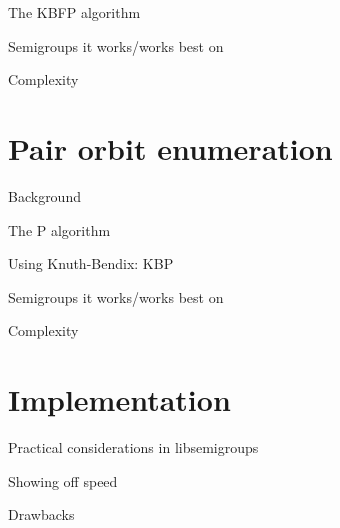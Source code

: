 The KBFP algorithm

Semigroups it works/works best on

Complexity

\section{Pair orbit enumeration}
\label{sec:p}

Background

The P algorithm

Using Knuth-Bendix: KBP

Semigroups it works/works best on

Complexity

\section{Implementation}

Practical considerations in libsemigroups

Showing off speed

Drawbacks

